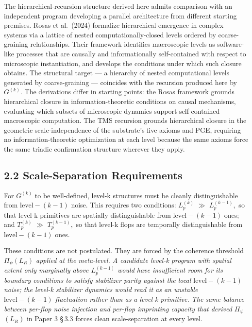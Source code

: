 \documentclass[11pt,oneside]{report}
\theoremstyle{definition}
\theoremstyle{remark}
\begin{document}
The hierarchical-recursion structure derived here admits comparison with
an independent program developing a parallel architecture from different
starting premises. Rosas et al.~(2024) formalize hierarchical emergence
in complex systems via a lattice of nested computationally-closed levels
ordered by coarse-graining relationships. Their framework identifies
macroscopic levels as software-like processes that are causally and
informationally self-contained with respect to microscopic
instantiation, and develops the conditions under which such closure
obtains. The structural target --- a hierarchy of nested computational
levels generated by coarse-graining --- coincides with the recursion
produced here by \ensuremath{G^{(k)}.} The derivations differ in starting points:
the Rosas framework grounds hierarchical closure in
information-theoretic conditions on causal mechanisms, evaluating which
subsets of microscopic dynamics support self-contained macroscopic
computation. The TMS recursion grounds hierarchical closure in the
geometric scale-independence of the substrate's five axioms and PGE,
requiring no information-theoretic optimization at each level because
the same axioms force the same triadic confirmation structure wherever
they apply.

\subsection*{2.2 Scale-Separation Requirements}

For \ensuremath{G^{(k)}} to be well-defined, level-k structures must be cleanly
distinguishable from \ensuremath{\text{level}-(k-1)} noise. This requires two conditions:
\ensuremath{L_{p}^{(k)}} \ensuremath{\gg} \ensuremath{L_{p}^{(k-1)},} so that level-k primitives are spatially
distinguishable from \ensuremath{\text{level}-(k-1)} ones; and \ensuremath{T_{p}^{(k)}} \ensuremath{\gg} \ensuremath{T_{p}^{(k-1)},}
so that level-k flops are temporally distinguishable from \ensuremath{\text{level}-(k-1)}
ones.

These conditions are not postulated. They are forced by the coherence
threshold \textbar \ensuremath{\Pi_{\psi}}\textbar{}\emph{\ensuremath{(L_{R})} applied at the meta-level.
A candidate level-k program with spatial extent only marginally above
\ensuremath{L_{p}^{(k-1)}} would have insufficient room for its boundary conditions
to satisfy stabilizer parity against the local \ensuremath{\text{level}-(k-1)} noise; the
level-k stabilizer dynamics would read it as an unstable \ensuremath{\text{level}-(k-1)}
fluctuation rather than as a level-k primitive. The same balance between
per-flop noise injection and per-flop imprinting capacity that derived
\textbar \ensuremath{\Pi_{\psi}}\textbar{}}\ensuremath{(L_{R})} in Paper 3 \S\,3.3 forces clean
scale-separation at every level.
\end{document}
